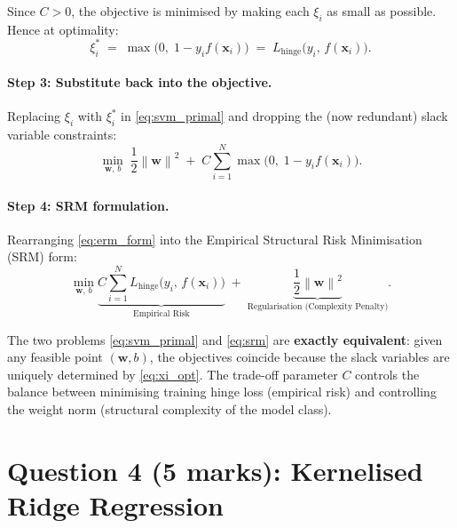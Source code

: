\documentclass[12pt,a4paper]{article}
\newcommand{\bx}{\bm{x}}
\newcommand{\bw}{\bm{w}}
\newcommand{\norm}[1]{\left\lVert #1 \right\rVert}
\begin{document}
Since $C > 0$, the objective is minimised by making each $\xi_i$ as small as
possible.  Hence at optimality:
\begin{equation}
  \xi_i^* \;=\; \max\!\bigl(0,\; 1 - y_i f(\bx_i)\bigr)
            \;=\; L_{\text{hinge}}\!\bigl(y_i,\, f(\bx_i)\bigr).
  \label{eq:xi_opt}
\end{equation}

\paragraph{Step 3: Substitute back into the objective.}

Replacing $\xi_i$ with $\xi_i^*$ in \eqref{eq:svm_primal} and dropping the
(now redundant) slack variable constraints:
\begin{equation}
  \min_{\bw,\, b}
  \;\frac{1}{2}\norm{\bw}^2
  \;+\; C\sum_{i=1}^{N}\max\!\bigl(0,\; 1 - y_i f(\bx_i)\bigr).
  \label{eq:erm_form}
\end{equation}

\paragraph{Step 4: SRM formulation.}

Rearranging \eqref{eq:erm_form} into the Empirical Structural Risk Minimisation
(SRM) form:
\begin{equation}
  \boxed{
  \min_{\bw,\, b}
  \underbrace{C\sum_{i=1}^{N}
     L_{\text{hinge}}\!\bigl(y_i,\, f(\bx_i)\bigr)}_{\text{Empirical Risk}}
  \;+\;
  \underbrace{\frac{1}{2}\norm{\bw}^2}_{\text{Regularisation (Complexity Penalty)}}.
  }
  \label{eq:srm}
\end{equation}

The two problems \eqref{eq:svm_primal} and \eqref{eq:srm} are
\textbf{exactly equivalent}: given any feasible point $(\bw, b)$, the objectives
coincide because the slack variables are uniquely determined by \eqref{eq:xi_opt}.
The trade-off parameter $C$ controls the balance between minimising training
hinge loss (empirical risk) and controlling the weight norm (structural
complexity of the model class).

\newpage
\section{Question 4 (5 marks): Kernelised Ridge Regression}
\end{document}
